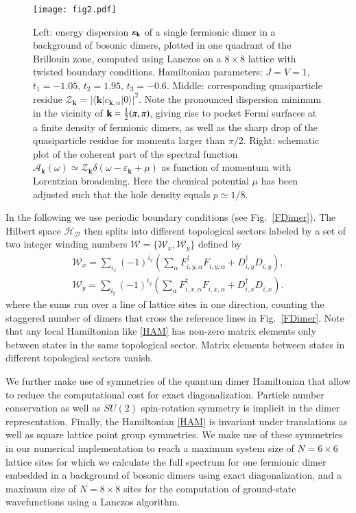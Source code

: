 \documentclass[aps,pra,reprint,showpacs,superscriptaddress]{revtex4-1}
\newcommand{\cre}[2]{{#1}^{\dagger}_{#2}}
\newcommand{\ann}[2]{{#1}^{\phantom{\dagger}}_{#2}}
\begin{document}
\begin{figure*}
\centering
\texttt{[image: fig2.pdf]}
\caption{Left: energy dispersion $\varepsilon_{\bold{k}}$ of a single fermionic dimer in a background of bosonic dimers, plotted in one quadrant of the Brillouin zone, computed using Lanczos on a $8\times8$ lattice with twisted boundary conditions. Hamiltonian parameters: $J=V=1$, $t_1=-1.05, \, t_2=1.95, \, t_3=-0.6$. Middle: corresponding quasiparticle residue $\mathcal{Z}_\mathbf{k} = |\langle \mathbf{k}| c_{\mathbf{k},\alpha} |0\rangle|^2$. Note the pronounced dispersion minimum in the vicinity of $\bold{k}=\tfrac{1}{2}(\pi,\pi)$, giving rise to pocket Fermi surfaces at a finite density of fermionic dimers, as well as the sharp drop of the quasiparticle residue for momenta larger than $\pi/2$. Right: schematic plot of the coherent part of the spectral function $\mathcal{A}_\mathbf{k}(\omega) \simeq \mathcal{Z}_\mathbf{k} \delta(\omega - \varepsilon_\mathbf{k} + \mu)$ as function of momentum with Lorentzian broadening. Here the chemical potential $\mu$ has been adjusted such that the hole density equals $p\simeq1/8$.}
\label{FPocket}
\end{figure*}

In the following we use periodic boundary conditions (see Fig.~\ref{FDimer}). The Hilbert space $\mathcal{H_D}$ then splits into different topological sectors labeled by a set of two integer winding numbers $\mathcal{W}=\{\mathcal{W}_x,\mathcal{W}_y\}$ defined by 
\begin{align}
\mathcal{W}_{x}=\sum_{i_x }  (-1)^{i_x} \left( \sum_{\alpha} \cre{F}{i,y,\alpha}\ann{F}{i,y,\alpha}+\cre{D}{i,y}\ann{D}{i,y} \right),\\
\mathcal{W}_{y}=\sum_{i_y }  (-1)^{i_y} \left( \sum_{\alpha} \cre{F}{i,x,\alpha}\ann{F}{i,x,\alpha}+\cre{D}{i,x}\ann{D}{i,x} \right).
\end{align}
where the sums run over a line of lattice sites in one direction, counting the staggered number of dimers that cross the reference lines in Fig.~\ref{FDimer}. 
Note that any local Hamiltonian like \eqref{HAM} has non-zero matrix elements only between states in the same topological sector. Matrix elements between states in different topological sectors vanish.

We further make use of symmetries of the quantum dimer Hamiltonian that allow to reduce the computational cost for exact diagonalization. Particle number conservation as well as $SU(2)$ spin-rotation symmetry is implicit in the dimer representation. Finally, the Hamiltonian \eqref{HAM} is invariant under translations as well as square lattice point group symmetries. 
We make use of these symmetries in our numerical implementation to reach a maximum system size of $N=6\times6$ lattice sites for which we calculate the full spectrum for one fermionic dimer embedded in a background of bosonic dimers using exact diagonalization, and a maximum size of $N=8\times8$ sites for the computation of ground-state wavefunctions using a Lanczos algorithm.
\end{document}
